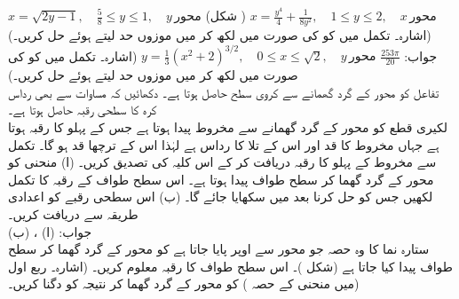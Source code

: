 $x=\sqrt{2y-1},\quad \tfrac{5}{8}\le y\le 1,\quad y\,\text{محور}$
\quad
(شکل )
$x=\tfrac{y^4}{4}+\tfrac{1}{8y^2},\quad 1\le y\le 2,\quad x\,\text{محور}$
\quad
(اشارہ۔ تکمل میں  کو  کی صورت میں لکھ کر  میں موزوں حد لیتے ہوئے حل کریں۔)\\
جواب:\quad
$\tfrac{253\pi}{20}$
$y=\tfrac{1}{3}(x^2+2)^{3/2},\quad 0\le x\le \sqrt{2},\quad y\,\text{محور}$
\quad
(اشارہ۔ تکمل میں  کو  کی صورت میں لکھ کر  میں موزوں حد لیتے ہوئے حل کریں۔)
\\
تفاعل  کو  محور کے گرد گھمانے سے کروی سطح حاصل ہوتا ہے۔ دکھائیں کہ مساوات  سے بھی رداس  کرہ کا سطحی رقبہ  حاصل ہوتا ہے۔
\\
لکیری قطع  کو  محور کے گرد گھمانے سے مخروط پیدا ہوتا ہے جس کے پہلو کا رقبہ  ہوتا ہے جہاں مخروط کا قد  اور اس کے تلا  کا رداس  ہے لہٰذا اس کے ترچھا قد  ہو گا۔ تکمل سے مخروط کے پہلو کا رقبہ دریافت کر کے اس کلیہ کی تصدیق کریں۔ 
   (ا) منحنی  کو  محور کے گرد گھما کر سطح طواف پیدا ہوتا ہے۔ اس سطح طواف کے رقبہ کا تکمل لکھیں جس کو حل کرنا بعد میں سکھایا جائے گا۔ (ب) اس سطحی رقبے کو اعدادی طریقہ سے دریافت کریں۔\\
جواب:\quad
(ا) ، (ب) 
\\
ستارہ نما  کا وہ حصہ جو  محور سے اوپر پایا جاتا ہے کو  محور کے گرد گھما کر سطح طواف پیدا کیا جاتا ہے (شکل )۔ اس سطح طواف کا رقبہ معلوم کریں۔ (اشارہ۔ ربع اول میں منحنی کے حصہ ) کو  محور کے گرد گھما کر نتیجہ  کو دگنا کریں۔)
